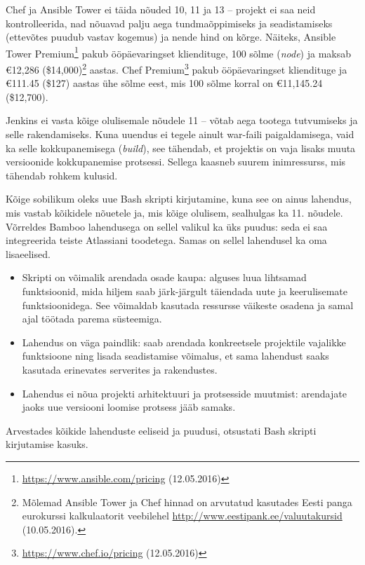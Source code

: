 \documentclass[12pt]{article}
\begin{document}
  Chef ja Ansible Tower ei täida nõuded 10, 11 ja 13 \--- projekt ei saa neid kontrolleerida, nad nõuavad palju aega tundmaõppimiseks ja seadistamiseks (ettevõtes puudub vastav kogemus) ja nende hind on kõrge. Näiteks, Ansible Tower Premium\footnote{\url{https://www.ansible.com/pricing} (12.05.2016)} pakub ööpäevaringset kliendituge, 100 sõlme (\textit{node}) ja maksab \euro 12,286 (\$14,000)\footnote{Mõlemad Ansible Tower ja Chef hinnad on arvutatud kasutades Eesti panga eurokurssi kalkulaatorit veebilehel \url{http://www.eestipank.ee/valuutakursid} (10.05.2016).} aastas. Chef Premium\footnote{\url{https://www.chef.io/pricing} (12.05.2016)} pakub ööpäevaringset kliendituge ja \euro 111.45 (\$127) aastas ühe sõlme eest, mis 100 sõlme korral on \euro 11,145.24 (\$12,700).
  
  Jenkins ei vasta kõige olulisemale nõudele 11 \--- võtab aega tootega tutvumiseks ja selle rakendamiseks. Kuna uuendus ei tegele ainult war\--faili paigaldamisega, vaid ka selle kokkupanemisega (\textit{build}), see tähendab, et projektis on vaja lisaks muuta versioonide kokkupanemise protsessi. Sellega kaasneb suurem inimressurss, mis tähendab rohkem kulusid.
  
  \newpage
  
  Kõige sobilikum oleks uue Bash skripti kirjutamine, kuna see on ainus lahendus, mis vastab kõikidele nõuetele ja, mis kõige olulisem, sealhulgas ka 11. nõudele. Võrreldes Bamboo lahendusega on sellel valikul ka üks puudus: seda ei saa integreerida teiste Atlassiani toodetega. Samas on sellel lahendusel ka oma lisaeelised.
  \begin{itemize}
    \item Skripti on võimalik arendada osade kaupa: alguses luua lihtsamad funktsioonid, mida hiljem saab järk\--järgult täiendada uute ja keerulisemate funktsioonidega. See võimaldab kasutada ressursse väikeste osadena ja samal ajal töötada parema süsteemiga.
    \item Lahendus on väga paindlik: saab arendada konkreetsele projektile vajalikke funktsioone ning lisada seadistamise võimalus, et sama lahendust saaks kasutada erinevates serverites ja rakendustes.
    \item Lahendus ei nõua projekti arhitektuuri ja protsesside muutmist: arendajate jaoks uue versiooni loomise protsess jääb samaks.
  \end{itemize}
  
  Arvestades kõikide lahenduste eeliseid ja puudusi, otsustati Bash skripti kirjutamise kasuks.
  
\end{document}
